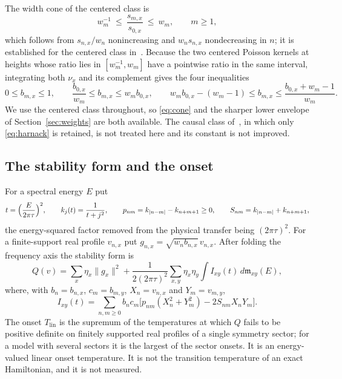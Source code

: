 \documentclass[10pt]{article}
\theoremstyle{remark}
\newcommand{\Tlin}{T_{\mathrm{lin}}}
\begin{document}
The width cone of the centered class is
\begin{equation}\label{eq:cone}
w_m^{-1}\ \le\ \frac{s_{m,x}}{s_{0,x}}\ \le\ w_m,\qquad m\ge1,
\end{equation}
which follows from $s_{n,x}/w_n$ nonincreasing and $w_ns_{n,x}$ nondecreasing in $n$; it is established for the centered class in~\cite{predecessor,optimum}. Because the two centered Poisson kernels at heights whose ratio lies in $[w_m^{-1},w_m]$ have a pointwise ratio in the same interval, integrating both $\nu_x$ and its complement gives the four inequalities
\begin{equation}\label{eq:harnack}
0\le b_{m,x}\le1,\qquad \frac{b_{0,x}}{w_m}\le b_{m,x}\le w_mb_{0,x},\qquad
w_mb_{0,x}-(w_m-1)\le b_{m,x}\le\frac{b_{0,x}+w_m-1}{w_m}.
\end{equation}
We use the centered class throughout, so \eqref{eq:cone} and the sharper lower envelope of Section~\ref{sec:weights} are both available. The causal class of~\cite{finiteenergy}, in which only \eqref{eq:harnack} is retained, is not treated here and its constant is not improved.

\subsection{The stability form and the onset}

For a spectral energy $E$ put
\[
t=\Bigl(\frac{E}{2\pi\tau}\Bigr)^2,\qquad k_j(t)=\frac1{t+j^2},\qquad p_{nm}=k_{|n-m|}-k_{n+m+1}\ge0,\qquad S_{nm}=k_{|n-m|}+k_{n+m+1},
\]
the energy-squared factor removed from the physical transfer being $(2\pi\tau)^2$. For a finite-support real profile $v_{n,x}$ put $g_{n,x}=\sqrt{w_nb_{n,x}}\,v_{n,x}$. After folding the frequency axis the stability form is
\begin{equation}\label{eq:form}
Q(v)=\sum_x\eta_x\|g_x\|^2+\frac{1}{2(2\pi\tau)^2}\sum_{x,y}\eta_x\eta_y\int I_{xy}(t)\,d\mathfrak m_{xy}(E),
\end{equation}
where, with $b_n=b_{n,x}$, $c_m=b_{m,y}$, $X_n=v_{n,x}$ and $Y_m=v_{m,y}$,
\[
I_{xy}(t)=\sum_{n,m\ge0}b_nc_m\bigl[p_{nm}(X_n^2+Y_m^2)-2S_{nm}X_nY_m\bigr].
\]
The onset $\Tlin$ is the supremum of the temperatures at which $Q$ fails to be positive definite on finitely supported real profiles of a single symmetry sector; for a model with several sectors it is the largest of the sector onsets. It is an energy-valued linear onset temperature. It is not the transition temperature of an exact Hamiltonian, and it is not measured.
\end{document}
